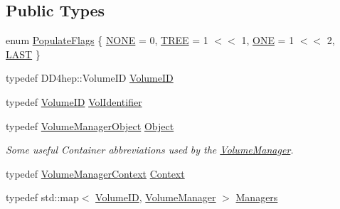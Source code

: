 \subsection*{Public Types}
\begin{DoxyCompactItemize}
\item 
enum \hyperlink{class_d_d4hep_1_1_geometry_1_1_volume_manager_a1c25b37c1377654bf2fbe1cf4743ebde}{PopulateFlags} \{ \hyperlink{class_d_d4hep_1_1_geometry_1_1_volume_manager_a1c25b37c1377654bf2fbe1cf4743ebdea8562837522298e9c40ab9cd35d9307ba}{NONE} =  0, 
\hyperlink{class_d_d4hep_1_1_geometry_1_1_volume_manager_a1c25b37c1377654bf2fbe1cf4743ebdeaf55015e5bb5659a574e760177f74324f}{TREE} =  1 $<$$<$ 1, 
\hyperlink{class_d_d4hep_1_1_geometry_1_1_volume_manager_a1c25b37c1377654bf2fbe1cf4743ebdeafbb9de2f3dcf9fbe2da0b22fa5cafac1}{ONE} =  1 $<$$<$ 2, 
\hyperlink{class_d_d4hep_1_1_geometry_1_1_volume_manager_a1c25b37c1377654bf2fbe1cf4743ebdea50ba5350b45be9b9e1b328d3069b572c}{LAST}
 \}
\item 
typedef DD4hep::VolumeID \hyperlink{class_d_d4hep_1_1_geometry_1_1_volume_manager_ab1f746b561c93be38bc7c6e66fc8ca8a}{VolumeID}
\item 
typedef \hyperlink{class_d_d4hep_1_1_geometry_1_1_volume_manager_ab1f746b561c93be38bc7c6e66fc8ca8a}{VolumeID} \hyperlink{class_d_d4hep_1_1_geometry_1_1_volume_manager_a934cf07a47c6c2d9932aef080f789da8}{VolIdentifier}
\item 
typedef \hyperlink{class_d_d4hep_1_1_geometry_1_1_volume_manager_object}{VolumeManagerObject} \hyperlink{class_d_d4hep_1_1_geometry_1_1_volume_manager_ac464fd441e5c72fb082e8cc6dd0937c4}{Object}
\begin{DoxyCompactList}\small\item\em Some useful Container abbreviations used by the \hyperlink{class_d_d4hep_1_1_geometry_1_1_volume_manager}{VolumeManager}. \item\end{DoxyCompactList}\item 
typedef \hyperlink{class_d_d4hep_1_1_geometry_1_1_volume_manager_context}{VolumeManagerContext} \hyperlink{class_d_d4hep_1_1_geometry_1_1_volume_manager_adadb14f2ccbeaad001b7bc6ddb6dc715}{Context}
\item 
typedef std::map$<$ \hyperlink{class_d_d4hep_1_1_geometry_1_1_volume_manager_ab1f746b561c93be38bc7c6e66fc8ca8a}{VolumeID}, \hyperlink{class_d_d4hep_1_1_geometry_1_1_volume_manager}{VolumeManager} $>$ \hyperlink{class_d_d4hep_1_1_geometry_1_1_volume_manager_ad60f5618f569c6604861b6e0eb1c71c9}{Managers}

\end{DoxyCompactItemize}
